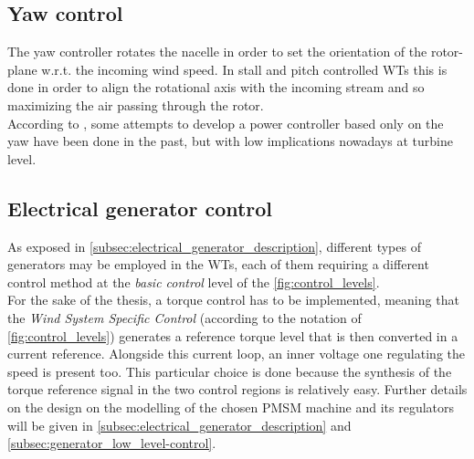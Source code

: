 \subsection{Yaw control}
The yaw controller rotates the nacelle in order to set the orientation of the rotor-plane w.r.t. the incoming wind speed. In stall and pitch controlled \acrshort{WTs} this is done in order to align the rotational axis with the incoming stream and so maximizing the air passing through the rotor. \\
According to \cite{Aerodynamics_of_wind_turbines}, some attempts to develop a power controller based only on the yaw have been done in the past, but with low implications nowadays at turbine level. 

\subsection{Electrical generator control}
As exposed in \autoref{subsec:electrical_generator_description}, different types of generators may be employed in the WTs, each of them requiring a different control method at the \textit{basic control} level of the \autoref{fig:control_levels}. \\
For the sake of the thesis, a torque control has to be implemented, meaning that the \textit{Wind System Specific Control} (according to the notation of \autoref{fig:control_levels}) generates a reference torque level that is then converted in a current reference. Alongside this current loop, an inner voltage one regulating the speed is present too. This particular choice is done because the synthesis of the torque reference signal in the two control regions is relatively easy. Further details on the design on the modelling of the chosen PMSM machine and its regulators will be given in \autoref{subsec:electrical_generator_description} and \autoref{subsec:generator_low_level-control}.